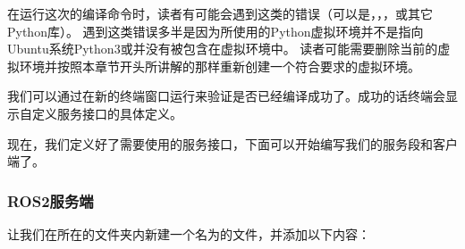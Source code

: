 \documentclass[letterpaper,10pt,english]{sphinxmanual}
\begin{document}
\sphinxAtStartPar
在运行这次的编译命令时，读者有可能会遇到这类的错误（可以是，，，或其它Python库）。
遇到这类错误多半是因为所使用的Python虚拟环境并不是指向Ubuntu系统Python3或并没有被包含在虚拟环境中。
读者可能需要删除当前的虚拟环境并按照本章节开头所讲解的那样重新创建一个符合要求的虚拟环境。

\sphinxAtStartPar
我们可以通过在新的终端窗口运行来验证是否已经编译成功了。成功的话终端会显示自定义服务接口的具体定义。

\sphinxAtStartPar
现在，我们定义好了需要使用的服务接口，下面可以开始编写我们的服务段和客户端了。


\subsubsection{ROS2服务端}
\label{\detokenize{chapter_rl_sys/ros_code_ex:id11}}
\sphinxAtStartPar
让我们在所在的文件夹内新建一个名为的文件，并添加以下内容：
\end{document}
